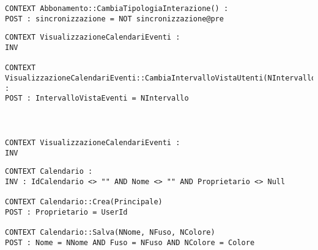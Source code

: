 \begin{listaPersonale}[OCL]{}
    \begin{lstlisting}
CONTEXT Abbonamento::CambiaTipologiaInterazione() :
POST : sincronizzazione = NOT sincronizzazione@pre 
    \end{lstlisting}

    \begin{lstlisting}
CONTEXT VisualizzazioneCalendariEventi :
INV 

CONTEXT VisualizzazioneCalendariEventi::CambiaIntervalloVistaUtenti(NIntervallo) :
POST : IntervalloVistaEventi = NIntervallo
    \end{lstlisting}
    \begin{lstlisting}
    \end{lstlisting}
    \begin{lstlisting}
    \end{lstlisting}
    \begin{lstlisting}
    \end{lstlisting}




    \begin{lstlisting}
CONTEXT VisualizzazioneCalendariEventi :
INV 
    \end{lstlisting}




    \begin{lstlisting}
CONTEXT Calendario :
INV : IdCalendario <> "" AND Nome <> "" AND Proprietario <> Null

CONTEXT Calendario::Crea(Principale)
POST : Proprietario = UserId

CONTEXT Calendario::Salva(NNome, NFuso, NColore)
POST : Nome = NNome AND Fuso = NFuso AND NColore = Colore 
    \end{lstlisting}




    \begin{lstlisting}
    \end{lstlisting}




    \begin{lstlisting}
    \end{lstlisting}





\end{listaPersonale}
